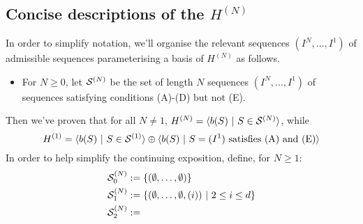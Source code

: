 \documentclass[10pt]{article}
\renewcommand{\Q}{Q}
\begin{document}
\begin{CalculatingRepeatedKoszul}
\subsection{Concise descriptions of the $H^{(N)}$}
In order to simplify notation, we'll organise the relevant sequences $(I^{N},\ldots,I^1)$ of admissible sequences parameterising a basis of $H^{{(N)}}$ as follows.
\begin{itemize}
\squishlist
\item For $N\geq0$, let $\mathcal{S}^{(N)}$ be the set of length $N$ sequences $(I^{N},\ldots,I^1)$ of sequences satisfying conditions \textup{(A)}-\textup{(D)} but not \textup{(E)}.
\end{itemize}
Then we've proven that for all $N\neq1$, $H^{(N)}=\langle b(S)\ |\ S\in\mathcal{S}^{(N)}\rangle$, while
\[H^{(1)}=
\langle b(S)\ |\ S\in\mathcal{S}^{(1)}\rangle\oplus\langle b(S)\ |\ S=(I^1)\textup{ satisfies (A) and (E)}\rangle
\]
In order to help simplify the continuing exposition, define, for $N\geq 1$:
\begin{alignat*}{2}
\calS^{(N)}_0
&:=
\{(\emptyset,\ldots,\emptyset)\}%
\\
\calS^{(N)}_1
&:=%
\{(\emptyset,\ldots,\emptyset,(i))\ |\ 2\leq i\leq d\}\\
\calS^{(N)}_2&:=

\end{alignat*}
\end{CalculatingRepeatedKoszul}
\end{document}
